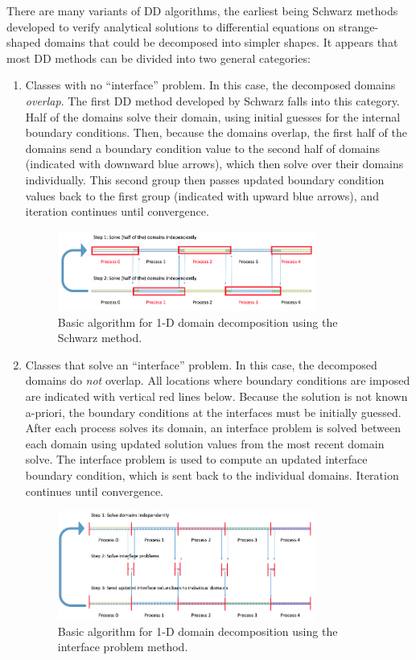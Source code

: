 \documentclass[10pt]{article}
\begin{document}
There are many variants of DD algorithms, the earliest being Schwarz methods developed to verify analytical solutions to differential equations on strange-shaped domains that could be decomposed into simpler shapes. It appears that most DD methods can be divided into two general categories:

\begin{enumerate}
\item Classes with no ``interface'' problem. In this case, the decomposed domains {\it overlap}. The first DD method developed by Schwarz falls into this category. Half of the domains solve their domain, using initial guesses for the internal boundary conditions. Then, because the domains overlap, the first half of the domains send a boundary condition value to the second half of domains (indicated with downward blue arrows), which then solve over their domains individually. This second group then passes updated boundary condition values back to the first group (indicated with upward blue arrows), and iteration continues until convergence. 

\begin{figure}[H]
\centering
\includegraphics[width=0.8\textwidth]{../figures/1D-schwarz2.png}
\caption{Basic algorithm for 1-D domain decomposition using the Schwarz method.}
\end{figure}

\item Classes that solve an ``interface'' problem. In this case, the decomposed domains do {\it not} overlap. All locations where boundary conditions are imposed are indicated with vertical red lines below. Because the solution is not known a-priori, the boundary conditions at the interfaces must be initially guessed. After each process solves its domain, an interface problem is solved between each domain using updated solution values from the most recent domain solve. The interface problem is used to compute an updated interface boundary condition, which is sent back to the individual domains. Iteration continues until convergence.

\begin{figure}[H]
\centering
\includegraphics[width=0.8\textwidth]{../figures/1D-dd2.png}
\caption{Basic algorithm for 1-D domain decomposition using the interface problem method.}
\end{figure}


\end{enumerate}
\end{document}
